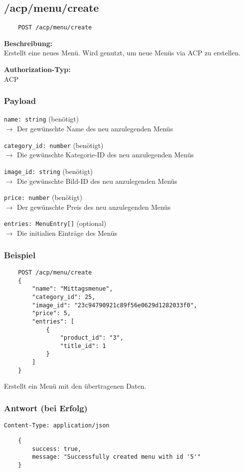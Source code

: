 \subsection{/acp/menu/create}

\begin{lstlisting}
    POST /acp/menu/create
\end{lstlisting}

\textbf{Beschreibung:} \\
Erstellt eine neues Menü. Wird genutzt, um neue Menüs via ACP zu erstellen.

\textbf{Authorization-Typ:} \\
ACP

\subsubsection{Payload}

\lstinline{name: string} (benötigt) \\
$\rightarrow$ Der gewünschte Name des neu anzulegenden Menüs

\lstinline{category_id: number} (benötigt) \\
$\rightarrow$ Die gewünschte Kategorie-ID des neu anzulegenden Menüs

\lstinline{image_id: string} (benötigt) \\
$\rightarrow$ Die gewünschte Bild-ID des neu anzulegenden Menüs

\lstinline{price: number} (benötigt) \\
$\rightarrow$ Der gewünschte Preis des neu anzulegenden Menüs

\lstinline{entries: MenuEntry[]} (optional) \\
$\rightarrow$ Die initialien Einträge des Menüs

\subsubsection{Beispiel}

\begin{lstlisting}
    POST /acp/menu/create
    {
        "name": "Mittagsmenue",
        "category_id": 25,
        "image_id": "23c94790921c89f56e0629d1282033f0",
        "price": 5,
        "entries": [
            {
                "product_id": "3",
                "title_id": 1
            }
        ]
    }
\end{lstlisting}

Erstellt ein Menü mit den übertragenen Daten.

\subsubsection{Antwort (bei Erfolg)}

\lstinline{Content-Type: application/json}
\begin{lstlisting}
    {
        success: true, 
        message: "Successfully created menu with id '5'"
    }
\end{lstlisting}